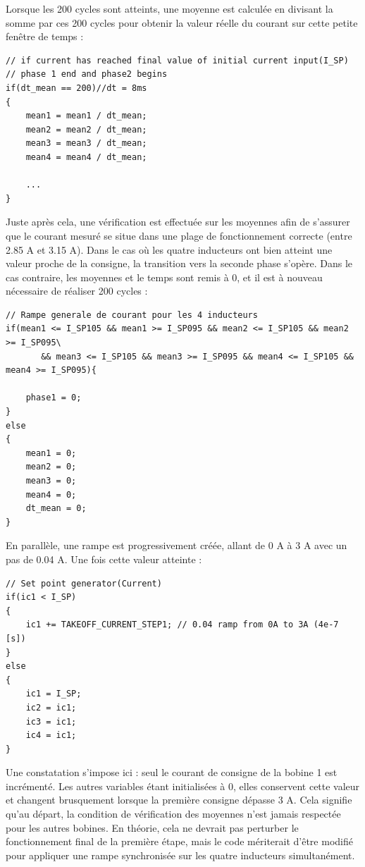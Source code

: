 Lorsque les 200 cycles sont atteints, une moyenne est calculée en divisant la somme par ces 200 cycles pour obtenir la valeur réelle du courant sur cette petite fenêtre de temps :

\begin{verbatim}
// if current has reached final value of initial current input(I_SP)
// phase 1 end and phase2 begins
if(dt_mean == 200)//dt = 8ms
{
    mean1 = mean1 / dt_mean;
    mean2 = mean2 / dt_mean;
    mean3 = mean3 / dt_mean;
    mean4 = mean4 / dt_mean;

    ...
}
\end{verbatim}

Juste après cela, une vérification est effectuée sur les moyennes afin de s'assurer que le courant mesuré se situe dans une plage de fonctionnement correcte (entre 2.85 A et 3.15 A). Dans le cas où les quatre inducteurs ont bien atteint une valeur proche de la consigne, la transition vers la seconde phase s'opère. Dans le cas contraire, les moyennes et le temps sont remis à 0, et il est à nouveau nécessaire de réaliser 200 cycles :

\begin{verbatim}
// Rampe generale de courant pour les 4 inducteurs
if(mean1 <= I_SP105 && mean1 >= I_SP095 && mean2 <= I_SP105 && mean2 >= I_SP095\
       && mean3 <= I_SP105 && mean3 >= I_SP095 && mean4 <= I_SP105 && mean4 >= I_SP095){

    phase1 = 0;
}
else
{
    mean1 = 0;
    mean2 = 0;
    mean3 = 0;
    mean4 = 0;
    dt_mean = 0;
}
\end{verbatim}

En parallèle, une rampe est progressivement créée, allant de 0 A à 3 A avec un pas de 0.04 A. Une fois cette valeur atteinte :

\begin{verbatim}
// Set point generator(Current)
if(ic1 < I_SP)
{
    ic1 += TAKEOFF_CURRENT_STEP1; // 0.04 ramp from 0A to 3A (4e-7 [s])
}
else
{
    ic1 = I_SP;
    ic2 = ic1;
    ic3 = ic1;
    ic4 = ic1;
}
\end{verbatim}

Une constatation s'impose ici : seul le courant de consigne de la bobine 1 est incrémenté. Les autres variables étant initialisées à 0, elles conservent cette valeur et changent brusquement lorsque la première consigne dépasse 3 A. Cela signifie qu'au départ, la condition de vérification des moyennes n'est jamais respectée pour les autres bobines. En théorie, cela ne devrait pas perturber le fonctionnement final de la première étape, mais le code mériterait d'être modifié pour appliquer une rampe synchronisée sur les quatre inducteurs simultanément.\\

